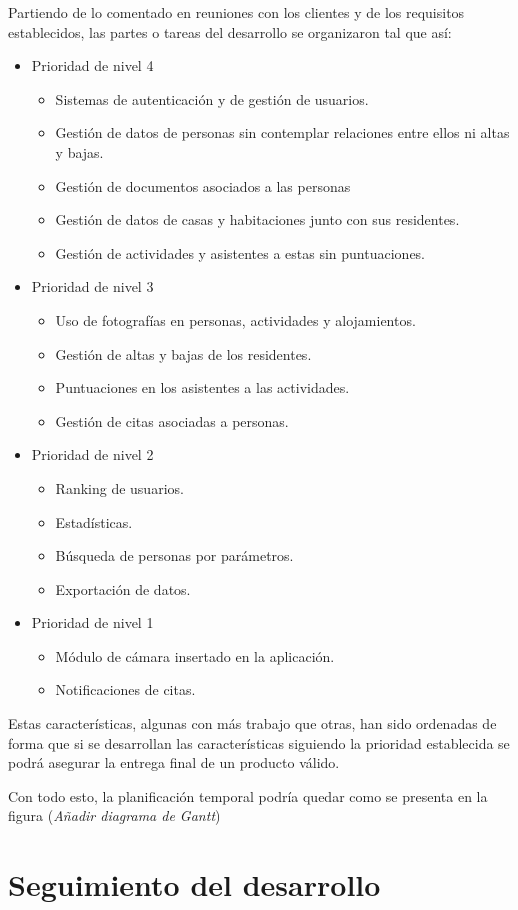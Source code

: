 Partiendo de lo comentado en reuniones con los clientes y de los requisitos establecidos, las partes o tareas del desarrollo se organizaron tal que así: 

\begin{itemize}
    \item Prioridad de nivel 4
    \begin{itemize}
        \item Sistemas de autenticación y de gestión de usuarios.
        \item Gestión de datos de personas sin contemplar relaciones entre ellos ni altas y bajas.
        \item Gestión de documentos asociados a las personas
        \item Gestión de datos de casas y habitaciones junto con sus residentes.
        \item Gestión de actividades y asistentes a estas sin puntuaciones.
    \end{itemize}
    \item Prioridad de nivel 3
    \begin{itemize}
        \item Uso de fotografías en personas, actividades y alojamientos.
        \item Gestión de altas y bajas de los residentes.
        \item Puntuaciones en los asistentes a las actividades.
        \item Gestión de citas asociadas a personas.
    \end{itemize}
    \item Prioridad de nivel 2
    \begin{itemize}
        \item Ranking de usuarios.
        \item Estadísticas.
        \item Búsqueda de personas por parámetros.
        \item Exportación de datos.
    \end{itemize}
    \item Prioridad de nivel 1
    \begin{itemize}
        \item Módulo de cámara insertado en la aplicación.
        \item Notificaciones de citas. 
    \end{itemize}
\end{itemize}

Estas características, algunas con más trabajo que otras, han sido ordenadas de forma que si se desarrollan las características siguiendo la prioridad establecida se podrá asegurar la entrega final de un producto válido.

Con todo esto, la planificación temporal podría quedar como se presenta en la figura (\textit{Añadir diagrama de Gantt})

\section{Seguimiento del desarrollo}
